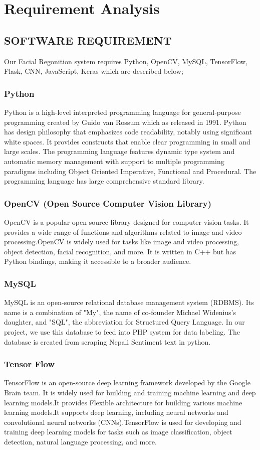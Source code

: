       \chapter{Requirement Analysis}
        \section{SOFTWARE REQUIREMENT}
Our Facial Regonition   system requires Python, OpenCV, MySQL, TensorFlow, Flask,
CNN, JavaScript, Keras which are described below;
            \subsection{Python}
Python is a high-level interpreted programming language for general-purpose
programming created by Guido van Rossum which as released in 1991. Python has
design philosophy that emphasizes code readability, notably using significant white
spaces. It provides constructs that enable clear programming in small and large scales.
The programming language features dynamic type system and automatic memory
management with support to multiple programming paradigms including Object
Oriented Imperative, Functional and Procedural. The programming language has large
comprehensive standard library.
\subsection{OpenCV (Open Source Computer Vision Library)}
OpenCV is a popular open-source library designed for computer vision tasks. It provides a wide range of functions and algorithms related to image and video processing.OpenCV is widely used for tasks like image and video processing, object detection, facial recognition, and more.
It is written in C++ but has Python bindings, making it accessible to a broader audience. 
\subsection{MySQL}
MySQL is an open-source relational database management system (RDBMS). Its name
is a combination of "My", the name of co-founder Michael Widenius's daughter, and
"SQL", the abbreviation for Structured Query Language. In our project, we use this
database to feed into PHP system for data labeling. The database is created from
scraping Nepali Sentiment text in python.
            \subsection{Tensor Flow}
TensorFlow is an open-source deep learning framework developed by the Google Brain team. It is widely used for building and training machine learning and deep learning models.It provides Flexible architecture for building various machine learning models.It supports deep learning, including neural networks and convolutional neural networks (CNNs).TensorFlow is used for developing and training deep learning models for tasks such as image classification, object detection, natural language processing, and more.

